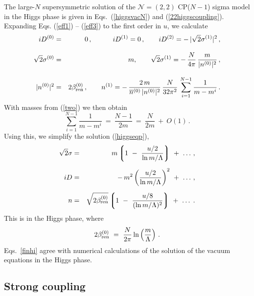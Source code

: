 \documentclass[epsfig,12pt]{article}
\def\beq{\begin{equation}}
\def\eeq{\end{equation}}
\def\beqn{\begin{eqnarray}}
\def\eeqn{\end{eqnarray}}
\def\beqn{\begin{eqnarray}}
\def\eeqn{\end{eqnarray}}
\def\beq{\begin{equation}}
\def\eeq{\end{equation}}
\newcommand{\ntwot}{${\mathcal N}= \left(2,2\right) $ }
\newcommand{\ov}{\overline}
\newcommand{\lgr}{\left\lgroup}
\newcommand{\rgr}{\right\rgroup}
\newcommand{\nz}{{n^{(0)}}}
\newcommand{\no}{{n^{(1)}}}
\newcommand{\bnz}{{\ov{n}{}^{(0)}}}
\newcommand{\Dz}{{D^{(0)}}}
\newcommand{\Do}{{D^{(1)}}}
\newcommand{\sigz}{{\sigma^{(0)}}}
\newcommand{\sigo}{{\sigma^{(1)}}}
\begin{document}
{	The large-$N$ supersymmetric solution of the \ntwot CP($N-1$) sigma model
	in the Higgs phase is
given in Eqs.~(\ref{higgsvacN}) and (\ref{22higgscoupling}).
Expanding Eqs. (\ref{eff1}) -- (\ref{eff3}) to the first order in $u$, we calculate
\beqn
	i \Dz 
	&=&
	 0\,,                    \qquad\quad      i\Do   = 0\,,  
			\qquad iD^{(2)} =  -\,|\sqrt{2}\sigo|^2\,, 
			\nonumber\\[3mm]
	\sqrt{2}\sigz &=& m,  \qquad       
	\sqrt{2}\sigo  = -\,\frac{N}{4\pi}\,\frac{m}{|\nz|^2}\,, 
	 \nonumber\\[3mm]
	|\nz|^2 
	&=&
	2\beta^{(0)}_{\rm ren}\,,              \qquad   
	\no =  -\,\frac{2\,m}{\bnz\,|\nz|^2}\,\frac{N}{32\pi^2}\,\sum_{i=1}^{N-1} \frac{1}{m - m^i}\,.
			\label{higgseqp}
			\eeqn
	With masses from (\ref{two}) we then obtain
\beq
	\sum_{i=1}^{N-1} \frac{1}{m - m^i} ~=~ \frac{N-1}{2m} ~=~ \frac{N}{2m} ~+~ O(1)\,.
	\label{higgseqpp}
\eeq
Using this, we simplify the solution (\ref{higgseqp}),
\beqn
%
	\sqrt{2}\sigma 
	&=&
	 m \lgr 1 ~-~ \frac{u/2}{{\rm ln}\, m/\Lambda} \rgr ~+~ \ldots \,,
	\nonumber\\[2mm]
%
	i D  
	&=&
	-\, m^2 \left( \frac{u/2}{{\rm ln}\, m/\Lambda} \right)^2  ~+~ \ldots\,,
	 \label{finhi}
	\\[2mm]
%
	n 
	&=&
	\sqrt{2\beta^{(0)}_{\rm ren}} \lgr 
			1 ~-~ \frac{ u/8 } { ( {\rm ln}\, m/\Lambda )^2 } \rgr ~+~ \ldots\;.
	\nonumber
\eeqn
This is in the Higgs phase, where
$$
2\beta^{(0)}_{\rm ren} ~=~ \frac{N}{2\pi}\,{\rm ln}\left(\frac{m}{\Lambda}\right)\,.
$$
Eqs.~\eqref{finhi} agree with numerical calculations of the solution of the 
vacuum equations in the Higgs phase. 

%
%
\subsection{Strong coupling}
\label{subsestrco}


}
\end{document}
